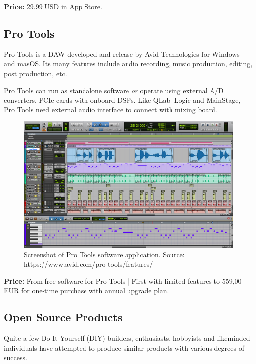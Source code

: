 \textbf{Price:} 29.99 USD in App Store. \\

\subsection{Pro Tools}
Pro Tools is a DAW developed and release by Avid Technologies for Windows and masOS. Its many features include audio recording, music production, editing, post production, etc. \newline

Pro Tools can run as standalone software \textit{or} operate using external A/D converters, PCIe cards with onboard DSPs. Like QLab, Logic and MainStage, Pro Tools need external audio interface to connect with mixing board. \\

\begin{figure}[H]
\centering
\includegraphics[scale=0.3]{./pictures/protools.png}
\caption{Screenshot of Pro Tools software application. Source: https://www.avid.com/pro-tools/features/}
\label{fig:protools.png}
\end{figure}

\textbf{Price:} From free software for Pro Tools | First with limited features to  559,00 EUR for one-time purchase with annual upgrade plan.

\subsection{Open Source Products}
Quite a few Do-It-Yourself (DIY) builders, enthusiasts, hobbyists and likeminded individuals have attempted to produce similar products with various degrees of success. \newline

